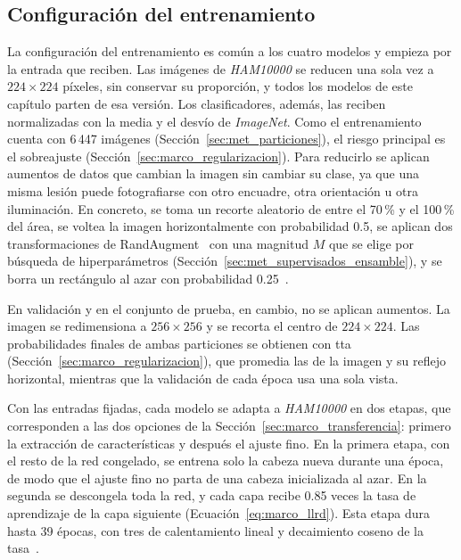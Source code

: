 

\subsection{Configuración del entrenamiento}
\label{sec:met_supervisados_receta}

La configuración del entrenamiento es común a los cuatro modelos y empieza por la entrada que reciben. Las imágenes de \emph{HAM10000} se reducen una sola vez a $224 \times 224$
píxeles, sin conservar su proporción, y todos los modelos de este capítulo parten de esa versión. Los clasificadores,
además, las reciben normalizadas con la media y el desvío de \emph{ImageNet}. Como el entrenamiento cuenta con 6\,447
imágenes (Sección~\ref{sec:met_particiones}), el riesgo principal es el sobreajuste
(Sección~\ref{sec:marco_regularizacion}). Para reducirlo se aplican aumentos de datos que cambian la imagen sin
cambiar su clase, ya que una misma lesión puede fotografiarse con otro encuadre, otra orientación u otra iluminación.
En concreto, se toma un recorte aleatorio de entre el 70\,\% y el 100\,\% del área, se voltea la imagen horizontalmente
con probabilidad 0.5, se aplican dos transformaciones de RandAugment~\cite{cubuk2020randaugment} con una magnitud $M$ que se elige por búsqueda de hiperparámetros (Sección~\ref{sec:met_supervisados_ensamble}), y se borra un rectángulo al azar con probabilidad 0.25~\cite{zhong2020random}.

En validación y en el conjunto de prueba, en cambio, no se aplican aumentos. La imagen se redimensiona a $256 \times 256$ y se recorta el
centro de $224 \times 224$. Las probabilidades finales de ambas particiones se obtienen con \gls{tta}
(Sección~\ref{sec:marco_regularizacion}), que promedia las de la imagen y su reflejo horizontal, mientras que la
validación de cada época usa una sola vista.

Con las entradas fijadas, cada modelo se adapta a \emph{HAM10000} en dos etapas, que corresponden a las dos opciones
de la Sección~\ref{sec:marco_transferencia}: primero la extracción de características y después el ajuste fino. En la
primera etapa, con el resto de la red congelado, se entrena solo la cabeza nueva durante una época, de modo que el
ajuste fino no parta de una cabeza inicializada al azar. En la segunda se descongela toda la red, y cada capa recibe
0.85 veces la tasa de aprendizaje de la capa siguiente (Ecuación~\ref{eq:marco_llrd}). Esta etapa dura hasta 39
épocas, con tres de calentamiento lineal y decaimiento coseno de la tasa~\cite{goyal2017accurate,loshchilov2017sgdr}.

